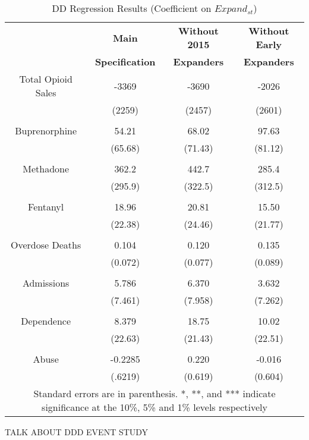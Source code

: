 \documentclass[11pt]{article}
\begin{document}
 
\begin{table}[!h]
\centering
\caption{DD Regression Results (Coefficient on $Expand_{st}$)}
\label{DD1}
\begin{tabular}{cccc}
\hline
\textbf{} &
\textbf{Main} & \textbf{Without 2015} & {\textbf{Without Early}}  \\ 
& \textbf{Specification} & \textbf{Expanders} & {\textbf{Expanders}}  \\ \hline
Total Opioid Sales & -3369 & -3690 & -2026 \\
                           & (2259) & (2457) & (2601)\\  
& & & \\   
Buprenorphine & 54.21 & 68.02 & 97.63 \\
                      & (65.68) & (71.43) & (81.12) \\ 
& & & \\
Methadone & 362.2 & 442.7  & 285.4\\
                 & (295.9) & (322.5) & (312.5) \\ 
& & & \\
Fentanyl & 18.96 & 20.81  &  15.50\\
              & (22.38) & (24.46) & (21.77) \\ 

& & & \\
Overdose Deaths & 0.104 & 0.120 & 0.135  \\ 
                          & (0.072) & (0.077) & (0.089) \\ 
& & & \\
Admissions & 5.786 & 6.370 & 3.632  \\
                 & (7.461) & (7.958) & (7.262)\\ 
& & & \\
Dependence & 8.379 & 18.75 & 10.02\\
                   & (22.63) & (21.43) & (22.51)\\ 
& & & \\
Abuse &-0.2285 & 0.220 & -0.016\\
           & (.6219) & (0.619) & (0.604)\\ 
\hline
 \multicolumn{4}{c}{\tiny{Standard errors are in parenthesis.  *, **, and *** indicate significance at the 10\%, 5\% and 1\% levels respectively}} \\
\hline
\end{tabular}
\end{table}


TALK ABOUT DDD EVENT STUDY
\end{document}

